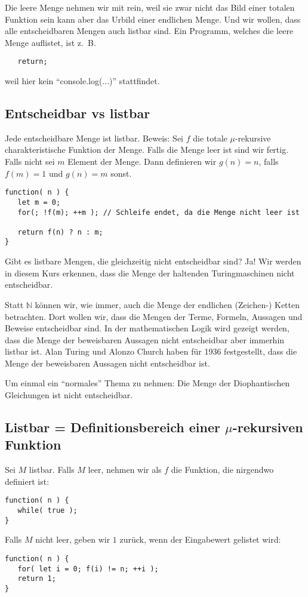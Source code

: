 \documentclass[a4paper]{amsart}
\theoremstyle{definition}
\newcommand{\N}{\ensuremath{\mathbb{ N }}}
\newcommand{\zb}{z.~B. }
\begin{document}
Die leere Menge nehmen wir mit rein, weil sie zwar nicht das Bild einer totalen Funktion sein kann aber das Urbild einer endlichen Menge. Und wir wollen, dass alle entscheidbaren Mengen auch listbar sind. Ein Programm, welches die leere Menge auflistet, ist \zb
\begin{lstlisting}
   return;
\end{lstlisting}
weil hier kein "`console.log(...)"' stattfindet.

\subsection{Entscheidbar vs listbar}
Jede entscheidbare Menge ist listbar. Beweis: Sei $f$ die totale $\mu$-rekursive charakteristische Funktion der Menge. Falls die Menge leer ist sind wir fertig. Falls nicht sei $m$ Element der Menge. Dann definieren wir $g(n) = n$, falls $f(m) = 1$ und $g(n) = m$ sonst. 
\begin{lstlisting}
function( n ) {
   let m = 0;  
   for(; !f(m); ++m ); // Schleife endet, da die Menge nicht leer ist
   
   return f(n) ? n : m;
}
\end{lstlisting}

Gibt es listbare Mengen, die gleichzeitig nicht entscheidbar sind? Ja! Wir werden in diesem Kurs erkennen, dass die Menge der haltenden Turingmaschinen nicht entscheidbar. 

Statt $\N$ können wir, wie immer, auch die Menge der endlichen (Zeichen-) Ketten betrachten. Dort wollen wir, dass die Mengen der Terme, Formeln, Aussagen und Beweise entscheidbar sind. In der mathematischen Logik wird gezeigt werden, dass die Menge der beweisbaren Aussagen nicht entscheidbar aber immerhin listbar ist. Alan Turing und Alonzo Church haben für 1936 festgestellt, dass die Menge der beweisbaren Aussagen nicht entscheidbar ist.

Um einmal ein "`normales"' Thema zu nehmen: Die Menge der Diophantischen Gleichungen ist nicht entscheidbar.

\subsection{Listbar = Definitionsbereich einer $\mu$-rekursiven Funktion}
Sei $M$ listbar. Falls $M$ leer, nehmen wir als $f$ die Funktion, die nirgendwo definiert ist:
\begin{lstlisting}
function( n ) {
   while( true );
}
\end{lstlisting}
Falls $M$ nicht leer, geben wir $1$ zurück, wenn der Eingabewert gelistet wird:
\begin{lstlisting}
function( n ) {
   for( let i = 0; f(i) != n; ++i );
   return 1;
}
\end{lstlisting}
\end{document}
